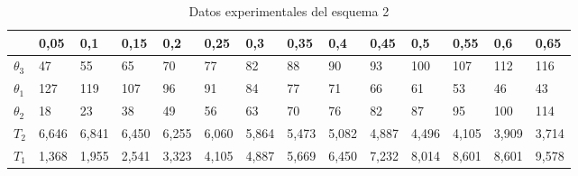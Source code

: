 \documentclass[a4paper]{article}
\begin{document}
\begin{table}[H]
\centering
\begin{tabular}{l|l|l|l|l|l|l|l|l|l|l|l|l|l|}
\cline{2-14}
\textbf{}                          & 0,05 & 0,1 & 0,15 & 0,2 & 0,25 & 0,3 & 0,35 & 0,4 & 0,45 & 0,5 & 0,55 & 0,6 & 0,65 \\ \hline
\multicolumn{1}{|l|}{\textbf{$\theta_3$}} & 47   & 55  & 65   & 70  & 77   & 82  & 88   & 90  & 93   & 100 & 107  & 112 & 116  \\ \hline
\multicolumn{1}{|l|}{\textbf{$\theta_1$}}   & 127  & 119 & 107  & 96  & 91   & 84  & 77   & 71  & 66   & 61  & 53   & 46  & 43   \\ \hline
\multicolumn{1}{|l|}{\textbf{$\theta_2$}}   & 18   & 23  & 38   & 49  & 56   & 63  & 70   & 76  & 82   & 87  & 95   & 100 & 114  \\ \hline
\multicolumn{1}{|l|}{\textbf{$T_2$}}  & 6,646 & 6,841 & 6,450 & 6,255 & 6,060 & 5,864 & 5,473 & 5,082 & 4,887 & 4,496 & 4,105 & 3,909 & 3,714 \\ \hline
\multicolumn{1}{|l|}{\textbf{$T_1$}}  & 1,368 & 1,955 & 2,541 & 3,323 & 4,105 & 4,887 & 5,669 & 6,450 & 7,232 & 8,014 & 8,601 & 8,601 & 9,578 \\ \hline
\end{tabular}
\caption{Datos experimentales del esquema 2}
\end{table}
\end{document}
